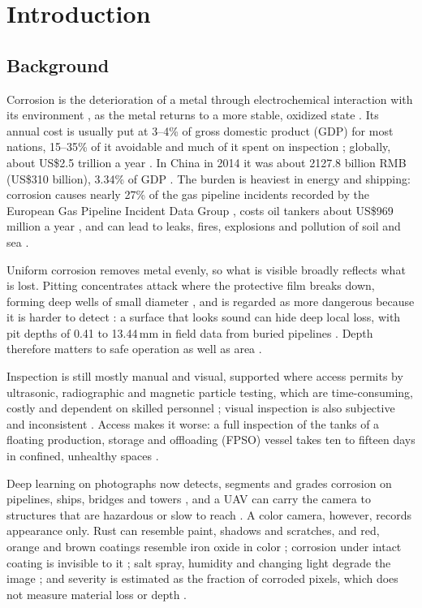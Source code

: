 \chapter[INTRODUCTION]{Introduction}
\label{ch:introduction}

\section{Background}
\label{sec:background}

Corrosion is the deterioration of a metal through electrochemical interaction
with its environment \citep{Alvani2026}, as the metal returns to a more stable,
oxidized state \citep{Elizalde2023}. Its annual cost is usually put at 3--4\% of
gross domestic product (GDP) for most nations, 15--35\% of it avoidable and much
of it spent on inspection \citep{Nash2022}; globally, about US\$2.5 trillion a
year \citep{Imran2025}. In China in 2014 it was about 2127.8 billion RMB (US\$310
billion), 3.34\% of GDP \citep{Hou2017}. The burden is heaviest in energy and
shipping: corrosion causes nearly 27\% of the gas pipeline incidents recorded by
the European Gas Pipeline Incident Data Group \citep{Akhlaghi2023}, costs oil
tankers about US\$969 million a year \citep{Imran2025}, and can lead to leaks,
fires, explosions and pollution of soil and sea \citep{Akhlaghi2023,Alvani2026}.

Uniform corrosion removes metal evenly, so what is visible broadly reflects what
is lost. Pitting concentrates attack where the protective film breaks down,
forming deep wells of small diameter \citep{Soares2023}, and is regarded as more
dangerous because it is harder to detect \citep{Soares2023}: a surface that looks
sound can hide deep local loss, with pit depths of 0.41 to 13.44\,mm in field data
from buried pipelines \citep{Akhlaghi2023}. Depth therefore matters to safe
operation as well as area \citep{Akhlaghi2023,Huang2026a}.

Inspection is still mostly manual and visual, supported where access permits by
ultrasonic, radiographic and magnetic particle testing, which are time-consuming,
costly and dependent on skilled personnel \citep{Alvani2026}; visual inspection is
also subjective and inconsistent \citep{Espinoza2026,Savino2025}. Access makes it
worse: a full inspection of the tanks of a floating production, storage and
offloading (FPSO) vessel takes ten to fifteen days in confined, unhealthy spaces
\citep{Soares2023}.

Deep learning on photographs now detects, segments and grades corrosion on
pipelines, ships, bridges and towers \citep{Nash2022,Fu2024,Alvani2026,Savino2025},
and a UAV can carry the camera to structures that are hazardous or slow to reach
\citep{Savino2025,Nooralishahi2022}. A color camera, however, records appearance
only. Rust can resemble paint, shadows and scratches, and red, orange and brown
coatings resemble iron oxide in color \citep{Espinoza2026,Lavadiya2022};
corrosion under intact coating is invisible to it
\citep{Elizalde2023,Hernndez-Surez2026}; salt spray, humidity and changing light
degrade the image \citep{Mao2026}; and severity is estimated as the fraction of
corroded pixels, which does not measure material loss or depth
\citep{Alvani2026}.

